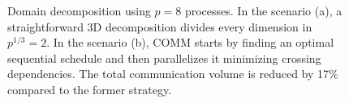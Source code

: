 \documentclass[sigplan,review,anonymous]{acmart}\settopmatter{printfolios=true,printccs=false,printacmref=false}
\begin{document}
\begin{figure}[!tbp]
\centering
%
%
\hfill
%
%
\caption{Domain decomposition using $p=8$  processes. In 
the scenario (a), a straightforward 3D decomposition divides every dimension in 
$p^{1/3}=2$. In the scenario (b), COMM starts by finding an optimal sequential 
schedule and then parallelizes it minimizing crossing dependencies. The total 
communication volume is reduced by 17\% compared to the former strategy.}
%
\label{fig:topdown-vs-bottomup}
\end{figure}
\end{document}
